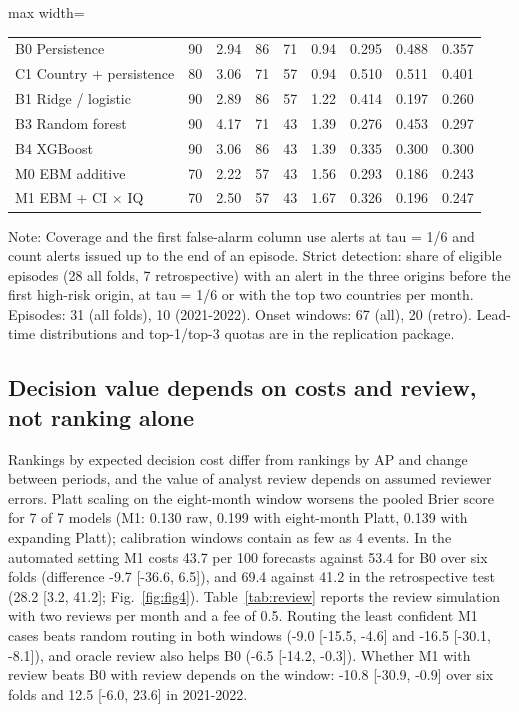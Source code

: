 \documentclass[preprint,12pt,authoryear]{elsarticle}
\begin{document}
\begin{table}[!htbp]
\begin{adjustbox}{max width=\textwidth}
\begin{tabular}{llrrrrrrr}
\midrule
B0 Persistence & 90 & 2.94 & 86 & 71 & 0.94 & 0.295 & 0.488 & 0.357 \\
C1 Country + persistence & 80 & 3.06 & 71 & 57 & 0.94 & 0.510 & 0.511 & 0.401 \\
B1 Ridge / logistic & 90 & 2.89 & 86 & 57 & 1.22 & 0.414 & 0.197 & 0.260 \\
B3 Random forest & 90 & 4.17 & 71 & 43 & 1.39 & 0.276 & 0.453 & 0.297 \\
B4 XGBoost & 90 & 3.06 & 86 & 43 & 1.39 & 0.335 & 0.300 & 0.300 \\
M0 EBM additive & 70 & 2.22 & 57 & 43 & 1.56 & 0.293 & 0.186 & 0.243 \\
M1 EBM + CI $\times$ IQ & 70 & 2.50 & 57 & 43 & 1.67 & 0.326 & 0.196 & 0.247 \\
\bottomrule
\end{tabular}
\end{adjustbox}
\par\vspace{2pt}\parbox{0.95\linewidth}{\scriptsize Note: Coverage and the first false-alarm column use alerts at tau = 1/6 and count alerts issued up to the end of an episode. Strict detection: share of eligible episodes (28 all folds, 7 retrospective) with an alert in the three origins before the first high-risk origin, at tau = 1/6 or with the top two countries per month. Episodes: 31 (all folds), 10 (2021-2022). Onset windows: 67 (all), 20 (retro). Lead-time distributions and top-1/top-3 quotas are in the replication package.}
\end{table}
\subsection{Decision value depends on costs and review, not ranking alone}
Rankings by expected decision cost differ from rankings by AP and change between periods, and the value of analyst review depends on assumed reviewer errors. Platt scaling on the eight-month window worsens the pooled Brier score for 7 of 7 models (M1: 0.130 raw, 0.199 with eight-month Platt, 0.139 with expanding Platt); calibration windows contain as few as 4 events. In the automated setting M1 costs 43.7 per 100 forecasts against 53.4 for B0 over six folds (difference -9.7 [-36.6, 6.5]), and 69.4 against 41.2 in the retrospective test (28.2 [3.2, 41.2]; Fig.~\ref{fig:fig4}). Table~\ref{tab:review} reports the review simulation with two reviews per month and a fee of 0.5. Routing the least confident M1 cases beats random routing in both windows (-9.0 [-15.5, -4.6] and -16.5 [-30.1, -8.1]), and oracle review also helps B0 (-6.5 [-14.2, -0.3]). Whether M1 with review beats B0 with review depends on the window: -10.8 [-30.9, -0.9] over six folds and 12.5 [-6.0, 23.6] in 2021-2022.
\end{document}
